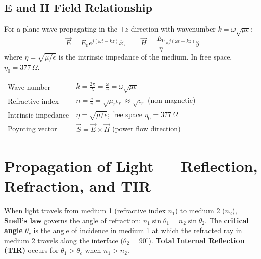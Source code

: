 \documentclass[12pt,a4paper]{article}
\renewcommand{\arraystretch}{1.45}
\begin{document}
\subsection{E and H Field Relationship}
For a plane wave propagating in the $+z$ direction with wavenumber $k = \omega\sqrt{\mu\epsilon}$:
\[
\vec{E} = E_0 e^{j(\omega t - kz)}\hat{x}, \qquad \vec{H} = \frac{E_0}{\eta} e^{j(\omega t - kz)}\hat{y}
\]
where $\eta = \sqrt{\mu/\epsilon}$ is the intrinsic impedance of the medium. In free space, $\eta_0 = 377\,\Omega$.

\begin{tcolorbox}[formulabox, title={\textbf{Key EM Wave Parameters}}]
\renewcommand{\arraystretch}{1.55}
\begin{tabularx}{\linewidth}{B{4.5cm} X}
Wave number & $k = \displaystyle\frac{2\pi}{\lambda} = \frac{\omega}{v} = \omega\sqrt{\mu\epsilon}$ \\[6pt]
Refractive index & $n = \displaystyle\frac{c}{v} = \sqrt{\mu_r \epsilon_r} \approx \sqrt{\epsilon_r}$ (non-magnetic) \\[6pt]
Intrinsic impedance & $\eta = \sqrt{\mu/\epsilon}$; \quad free space $\eta_0 = 377\,\Omega$ \\[4pt]
Poynting vector & $\vec{S} = \vec{E} \times \vec{H}$ \quad (power flow direction) \\[4pt]
\end{tabularx}
\end{tcolorbox}

\section{Propagation of Light --- Reflection, Refraction, and TIR}

\begin{tcolorbox}[defbox, title={\textbf{Snell's Law and Critical Angle}}]
When light travels from medium 1 (refractive index $n_1$) to medium 2 ($n_2$), \textbf{Snell's law} governs the angle of refraction: $n_1 \sin\theta_1 = n_2 \sin\theta_2$. The \textbf{critical angle} $\theta_c$ is the angle of incidence in medium 1 at which the refracted ray in medium 2 travels along the interface ($\theta_2 = 90^\circ$). \textbf{Total Internal Reflection (TIR)} occurs for $\theta_1 > \theta_c$ when $n_1 > n_2$.
\end{tcolorbox}
\end{document}
